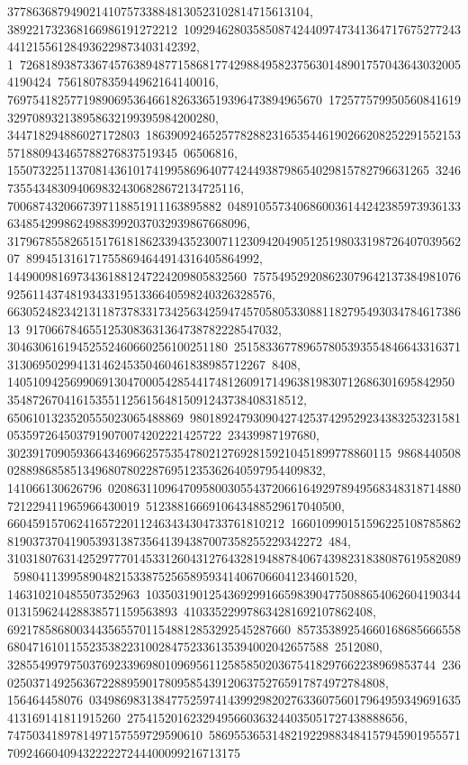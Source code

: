 {{{377863687949021410757338848130523102814715613104, 389221732368166986191272212\
10929462803585087424409747341364717675277243441215561284936229873403142392, 1\
72681893873367457638948771586817742988495823756301489017570436430320054190424\
7561807835944962164140016, 76975418257719890695364661826336519396473894965670\
172577579950560841619329708932138958632199395984200280, 344718294886027172803\
18639092465257782882316535446190266208252291552153571880943465788276837519345\
06506816, 1550732251137081436101741995869640774244938798654029815782796631265\
32467355434830940698324306828672134725116, 7006874320667397118851911163895882\
048910557340686003614424238597393613363485429986249883992037032939867668096, 
   31796785582651517618186233943523007112309420490512519803319872640703956207\
8994513161717558694644914316405864992, 14490098169734361881247224209805832560\
757549529208623079642137384981076925611437481934331951336640598240326328576, 
   66305248234213118737833173425634259474570580533088118279549303478461738613\
9170667846551253083631364738782228547032, 30463061619452552460660256100251180\
25158336778965780539355484664331637131306950299413146245350460461838985712267\
8408, 14051094256990691304700054285441748126091714963819830712686301695842950\
35487267041615355112561564815091243738408318512, 6506101323520555023065488869\
98018924793090427425374295292343832532315810535972645037919070074202221425722\
23439987197680, 3023917090593664346966257535478021276928159210451899778860115\
986844050802889868585134968078022876951235362640597954409832, 141066130626796\
02086311096470958003055437206616492978949568348318714880721229411965966430019\
5123881666910643488529617040500, 66045915706241657220112463434304733761810212\
16601099015159622510878586281903737041905393138735641394387007358255229342272\
484, 310318076314252977701453312604312764328194887840674398231838087619582089\
598041139958904821533875256589593414067066041234601520, 146310210485507352963\
10350319012543692991665983904775088654062604190344013159624428838571159563893\
410335229978634281692107862408, 692178586800344356557011548812853292545287660\
85735389254660168685666558680471610115523538223100284752336135394002042657588\
2512080, 32855499797503769233969801096956112585850203675418297662238969853744\
236025037149256367228895901780958543912063752765917874972784808, 156464458076\
03498698313847752597414399298202763360756017964959349691635413169141811915260\
27541520162329495660363244035051727438888656, 7475034189781497157559729590610\
58695536531482192298834841579459019555717092466040943222227244400099216713175\
}}}
